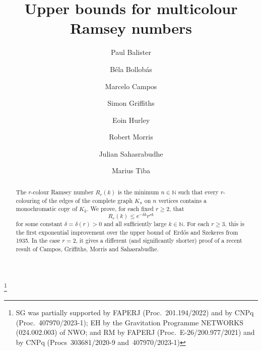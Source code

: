 \documentclass[12pt,reqno]{amsart}
\theoremstyle{definition}
\theoremstyle{remark}
\newcommand\N{\mathbb{N}}
\renewcommand{\le}{\leqslant}
\renewcommand{\ge}{\geqslant}
\def\N{\mathbb{N}}
\begin{document}
\title{Upper bounds for multicolour Ramsey numbers}

\author{Paul Balister \and B\'ela Bollob\'as \and Marcelo Campos \and Simon Griffiths \and Eoin Hurley\and Robert Morris \and Julian Sahasrabudhe \and Marius Tiba}

\address{Mathematical Institute, University of Oxford, Radcliffe Observatory Quarter, Woodstock Road, Oxford, OX2 6GG, UK}

\address{Department of Pure Mathematics and Mathematical Statistics, Wilberforce Road, Cambridge, CB3 0WA, UK, and Department of Mathematical Sciences, University of Memphis, Memphis, TN 38152, USA}

\address{Trinity College, Cambridge, CB2 1TQ, UK}

\address{Departamento de Matem\'atica, PUC-Rio, Rua Marqu\^{e}s de S\~{a}o Vicente 225, G\'avea, 22451-900 Rio de Janeiro, Brasil}

\address{Mathematical Institute, University of Oxford, Radcliffe Observatory Quarter, Woodstock Road, Oxford, OX2 6GG, UK}

\address{IMPA, Estrada Dona Castorina 110, Jardim Bot\^anico, Rio de Janeiro, 22460-320, Brasil}

\address{Department of Pure Mathematics and Mathematical Statistics, Wilberforce Road, Cambridge, CB3 0WA, UK}

\address{Department of Mathematics, King’s College London, Strand, London, WC2R 2LS, UK}

\thanks{SG was partially supported by FAPERJ (Proc.~201.194/2022) and by CNPq (Proc.~407970/2023-1); EH by the Gravitation Programme NETWORKS (024.002.003) of NWO; and RM by FAPERJ (Proc.~E-26/200.977/2021) and by CNPq (Procs~303681/2020-9 and~407970/2023-1)}

%
\begin{abstract}
	The \(r\)-colour Ramsey number \(R_r(k)\) is the minimum \(n \in \N\) such that every \(r\)-colouring of the edges of the complete graph \(K_n\) on \(n\) vertices contains a monochromatic copy of \(K_k\). We prove, for each fixed \(r \ge 2\), that
	\begin{equation*}
		R_r(k) \le e^{-\delta k} r^{rk}
	\end{equation*}
	for some constant \(\delta = \delta(r) > 0\) and all sufficiently large \(k \in \N\). For each \(r \ge 3\), this is the first exponential improvement over the upper bound of~Erd\H{o}s and Szekeres from 1935. In the case \(r = 2\), it gives a different (and significantly shorter) proof of a recent result of Campos, Griffiths, Morris and Sahasrabudhe.
\end{abstract}
%
\end{document}
